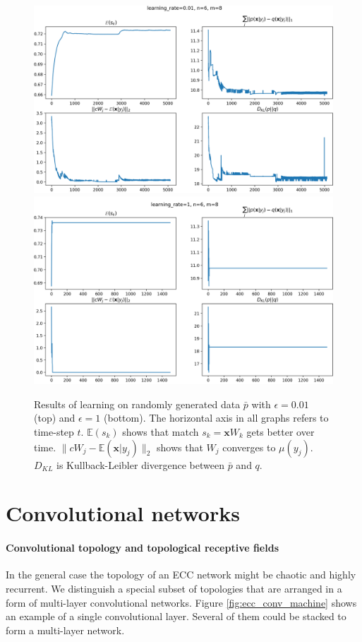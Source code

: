 \documentclass[12pt]{article}
\begin{document}
\begin{figure}[!htbp]
	\centering
	\includegraphics[width=13.5cm]{k_means_convergence}
	\includegraphics[width=13.5cm]{k_means_convergence2}
	\caption{Results of learning on randomly generated data $\bar{p}$ with $\epsilon=0.01$ (top) and $\epsilon=1$ (bottom). The horizontal axis in all graphs refers to time-step $t$. $\mathbb{E}(s_k)$ shows that match $s_k=\boldsymbol{x}W_k$ gets better over time. $\lVert c W_j - \mathbb{E}(\boldsymbol{x}|y_j)\rVert_2$ shows that $W_j$ converges to $\mu(y_j)$. $D_{KL}$ is Kullback-Leibler divergence between $\bar{p}$ and $q$.}
	\label{fig:k_means}
\end{figure} 


\section{Convolutional networks}

\paragraph{Convolutional topology and topological receptive fields} In  the general case the topology of an ECC network might be chaotic and highly recurrent. We distinguish a special subset of topologies that are arranged in a form of multi-layer convolutional networks. Figure \ref{fig:ecc_conv_machine} shows an example of a single convolutional layer. Several of them could be stacked to form a multi-layer network. 
\end{document}
